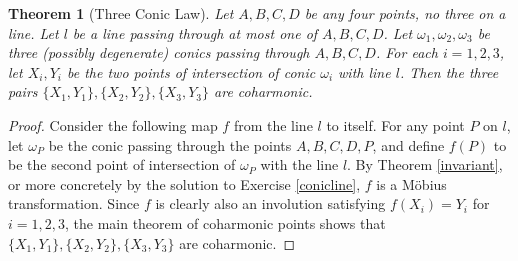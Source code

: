 \documentclass[letterpaper,11pt]{article}
\newtheorem{thm}{Theorem}
\theoremstyle{definition}
\theoremstyle{remark}
\begin{document}
\begin{thm}[Three Conic Law] Let $A,B,C,D$ be any four points, no three on a line. Let $l$ be a line passing through at most one of $A,B,C,D$. Let $\omega_1,\omega_2,\omega_3$ be three (possibly degenerate) conics passing through $A,B,C,D$. For each $i=1,2,3$, let $X_i, Y_i$ be the two points of intersection of conic $\omega_i$ with line $l$. Then the three pairs $\{X_1, Y_1\}, \{X_2,Y_2\}, \{X_3,Y_3\}$ are coharmonic.
\end{thm}
\begin{proof} Consider the following map $f$ from the line $l$ to itself. For any point $P$ on $l$, let $\omega_P$ be the conic passing through the points $A,B,C,D,P$, and define $f(P)$ to be the second point of intersection of $\omega_P$ with the line $l$. By Theorem \ref{invariant}, or more concretely by the solution to Exercise \ref{conicline}, $f$ is a M\"obius transformation. Since $f$ is clearly also an involution satisfying $f(X_i) = Y_i$ for $i=1,2,3$, the main theorem of coharmonic points shows that $\{X_1, Y_1\}, \{X_2,Y_2\}, \{X_3,Y_3\}$ are coharmonic.
\end{proof}
\end{document}
